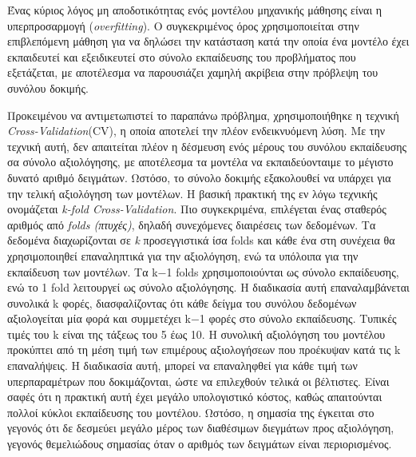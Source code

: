 \documentclass[diploma]{softlab-thesis}
\begin{document}
\begin{enumerate}
\begin{enumerate}
Ένας κύριος λόγος μη αποδοτικότητας ενός μοντέλου μηχανικής μάθησης είναι η υπερπροσαρμογή (\textit{overfitting}). Ο συγκεκριμένος όρος χρησιμοποιείται στην επιβλεπόμενη μάθηση για να δηλώσει την κατάσταση κατά την οποία ένα μοντέλο έχει εκπαιδευτεί και εξειδικευτεί στο σύνολο εκπαίδευσης του προβλήματος που εξετάζεται, με αποτέλεσμα να παρουσιάζει χαμηλή ακρίβεια στην πρόβλεψη του συνόλου δοκιμής. \vspace{0.5cm}

Προκειμένου να αντιμετωπιστεί το παραπάνω πρόβλημα, χρησιμοποιήθηκε η τεχνική \textit{Cross-Validation}(CV), η οποία αποτελεί την πλέον ενδεικνυόμενη λύση. Με την τεχνική αυτή, δεν απαιτείται πλέον η δέσμευση ενός μέρους του συνόλου εκπαίδευσης σα σύνολο αξιολόγησης, με αποτέλεσμα τα μοντέλα να εκπαιδεύονταιμε το μέγιστο δυνατό αριθμό δειγμάτων. Ωστόσο, το σύνολο δοκιμής εξακολουθεί να υπάρχει για την τελική αξιολόγηση των μοντέλων. Η βασική πρακτική της εν λόγω τεχνικής ονομάζεται \textit{k-fold Cross-Validation}. Πιο συγκεκριμένα, επιλέγεται ένας σταθερός αριθμός από \textit{folds (πτυχές)}, δηλαδή συνεχόμενες διαιρέσεις των δεδομένων. Τα δεδομένα διαχωρίζονται σε \textit{k} προσεγγιστικά ίσα folds και κάθε ένα στη συνέχεια θα χρησιμοποιηθεί επαναληπτικά για την αξιολόγηση, ενώ τα υπόλοιπα για την εκπαίδευση των μοντέλων. Τα k−1 folds χρησιμοποιούνται ως σύνολο εκπαίδευσης, ενώ το 1 fold λειτουργεί ως σύνολο αξιολόγησης. Η διαδικασία αυτή επαναλαμβάνεται συνολικά  k φορές, διασφαλίζοντας ότι κάθε δείγμα του συνόλου δεδομένων αξιολογείται μία φορά και συμμετέχει k−1 φορές στο σύνολο εκπαίδευσης. Τυπικές τιμές του k είναι της τάξεως του 5 έως 10. Η συνολική αξιολόγηση του μοντέλου προκύπτει από τη μέση τιμή των επιμέρους αξιολογήσεων που προέκυψαν κατά τις k επαναλήψεις. Η διαδικασία αυτή, μπορεί να επαναληφθεί για κάθε τιμή των υπερπαραμέτρων που δοκιμάζονται, ώστε να επιλεχθούν τελικά οι βέλτιστες. Είναι σαφές ότι η πρακτική αυτή έχει μεγάλο υπολογιστικό κόστος, καθώς απαιτούνται πολλοί κύκλοι εκπαίδευσης του μοντέλου. Ωστόσο, η σημασία της έγκειται στο γεγονός ότι δε δεσμεύει μεγάλο μέρος των διαθέσιμων διεγμάτων προς αξιολόγηση, γεγονός θεμελιώδους σημασίας όταν ο αριθμός των δειγμάτων είναι περιορισμένος. \vspace{0.5cm}


\end{enumerate}
\end{enumerate}
\end{document}
